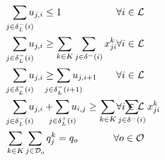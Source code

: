 \begin{alignat}{3}
    \label{mod:c22}        & \hspace{2mm} \smashoperator{ \sum_{ j \in \delta^{-}_{L}(i)}}{u_{j,i } } \leq 1                                                                                                                                                                                                                  & \hspace{-20mm} \forall i \in \mathcal{L}                                                         \\
    \label{mod:c230}       & \hspace{2mm} \smashoperator{ \sum_{ j \in \delta^{-}_{L}(i)}}{u_{j,i } }  \geq \sum_{k \in K}\sum_{j \in  \delta^{-}(i) }{x^k_{ji}}                                                                                                                                                              & \hspace{-20mm} \forall i \in \mathcal{L}                                                         \\
    \label{mod:c231}       & \hspace{2mm} \smashoperator{ \sum_{ j \in \delta^{-}_{L}(i)}}{u_{j,i } } \geq \smashoperator{ \sum_{ j \in \delta^{-}_{L}(i+1)}}{u_{j,i+1 } }                                                                                                                                                    & \hspace{-20mm} \forall i \in \mathcal{L}                                                         \\
    \label{mod:c23}        & \hspace{2mm} \smashoperator{ \sum_{ j \in \delta^{-}_{L}(i)}}{u_{j,i } } + \smashoperator{ \sum_{ j \in \delta^{+}_{L}(i)}}{u_{i,j } } \geq \sum_{k \in K}\sum_{j \in  \delta^{-}(i) }{x^k_{ji}}                                                                                                 & \hspace{-20mm} \forall i \in \mathcal{L}                                                         \\
    \label{mod:c24}        & \sum_{k \in K}\sum_{j \in \mathcal{D}_o}{q^k_j} = q_o                                                                                                                                                                                                                                            & \hspace{-20mm}  \forall o \in \mathcal{O}                                                        \\

\end{alignat}
